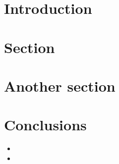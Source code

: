 \documentclass[portrait,a1]{a0poster}
\begin{document}
\begin{multicols}{3} %

\section{Introduction}

\lipsum[1]

\section{Section}

\lipsum[2-3]

\section{Another section}

\lipsum[4-7]

\section{Conclusions}

\begin{itemize}
\item \lipsum[8]
\item \lipsum[9]
\end{itemize}

\end{multicols}

\vfill %
\end{document}
